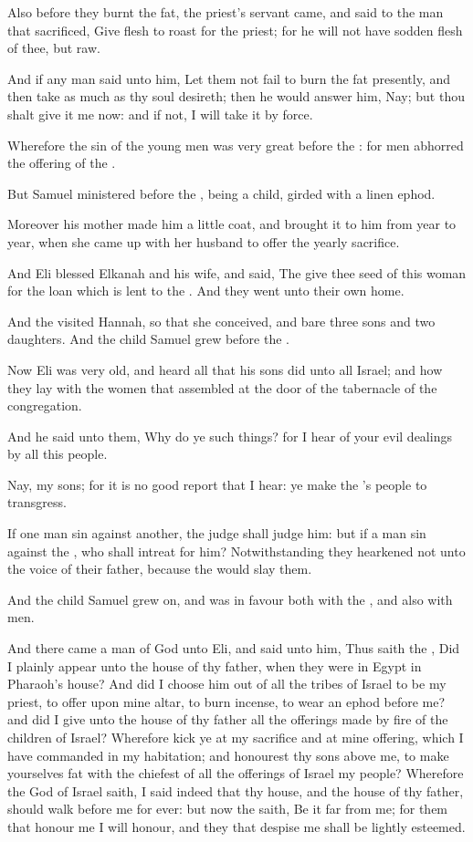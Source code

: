 \verse Also before they burnt the fat, the priest's servant came, and said to the man that sacrificed, Give flesh to roast for the priest; for he will not have sodden flesh of thee, but raw.

\verse And if any man said unto him, Let them not fail to burn the fat presently, and then take as much as thy soul desireth; then he would answer him, Nay; but thou shalt give it me now: and if not, I will take it by force.

\verse Wherefore the sin of the young men was very great before the \LORD: for men abhorred the offering of the \LORD.

\verse But Samuel ministered before the \LORD, being a child, girded with a linen ephod.

\verse Moreover his mother made him a little coat, and brought it to him from year to year, when she came up with her husband to offer the yearly sacrifice.

\verse And Eli blessed Elkanah and his wife, and said, The \LORD give thee seed of this woman for the loan which is lent to the \LORD. And they went unto their own home.

\verse And the \LORD visited Hannah, so that she conceived, and bare three sons and two daughters. And the child Samuel grew before the \LORD.

\verse Now Eli was very old, and heard all that his sons did unto all Israel; and how they lay with the women that assembled at the door of the tabernacle of the congregation.

\verse And he said unto them, Why do ye such things? for I hear of your evil dealings by all this people.

\verse Nay, my sons; for it is no good report that I hear: ye make the \LORD's people to transgress.

\verse If one man sin against another, the judge shall judge him: but if a man sin against the \LORD, who shall intreat for him? Notwithstanding they hearkened not unto the voice of their father, because the \LORD would slay them.

\verse And the child Samuel grew on, and was in favour both with the \LORD, and also with men.

\verse And there came a man of God unto Eli, and said unto him, Thus saith the \LORD, Did I plainly appear unto the house of thy father, when they were in Egypt in Pharaoh's house?  \verse And did I choose him out of all the tribes of Israel to be my priest, to offer upon mine altar, to burn incense, to wear an ephod before me? and did I give unto the house of thy father all the offerings made by fire of the children of Israel?  \verse Wherefore kick ye at my sacrifice and at mine offering, which I have commanded in my habitation; and honourest thy sons above me, to make yourselves fat with the chiefest of all the offerings of Israel my people?  \verse Wherefore the \LORD God of Israel saith, I said indeed that thy house, and the house of thy father, should walk before me for ever: but now the \LORD saith, Be it far from me; for them that honour me I will honour, and they that despise me shall be lightly esteemed.


